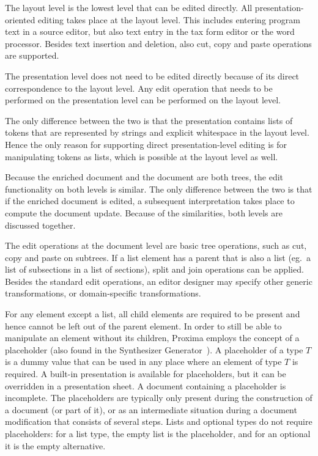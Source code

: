 
The layout level is the lowest level that can be edited directly. All presentation-oriented editing takes place at the layout level. This includes entering program text in a source editor, but also text entry in the tax form editor or the word processor. Besides text insertion and deletion, also cut, copy and paste operations are supported.


The presentation level does not need to be edited directly because of its direct correspondence to the layout level. Any edit operation that needs to be performed on the presentation level can be performed on the layout level.

\bc The only difference between the two is that the presentation contains lists of tokens that are represented by strings and explicit whitespace in the layout level. Hence the only reason for supporting direct presentation-level editing is for manipulating tokens as lists, which is possible at the layout level as well. \ec


Because the enriched document and the document are both trees, the edit functionality on both levels is similar. The only difference between the two is that if the enriched document is edited, a subsequent interpretation takes place to compute the document update. Because of the similarities, both levels are discussed together.

The edit operations at the document level are basic tree operations, such as cut, copy and paste on subtrees. If a list element has a parent that is also a list (eg.\ a list of subsections in a list of sections), split and join operations can be applied. Besides the standard edit operations, an editor designer may specify other generic transformations, or domain-specific transformations.

For any element except a list, all child elements are required to be present and hence cannot be left out of the parent element. In order to still be able to manipulate an element without its children, Proxima employs the concept of a placeholder (also found in the Synthesizer Generator~\cite{reps84synGen}). A placeholder of a type $T$ is a dummy value that can be used in any place where an element of type $T$ is required. \bc A built-in presentation is available for placeholders, but it can be overridden in a presentation sheet. \ec A document containing a placeholder is incomplete. The placeholders are typically only present during the construction of a document (or part of it), or as an intermediate situation during a document modification that consists of several steps. Lists and optional types do not require placeholders: for a list type, the empty list is the placeholder, and for an optional it is the empty alternative.

